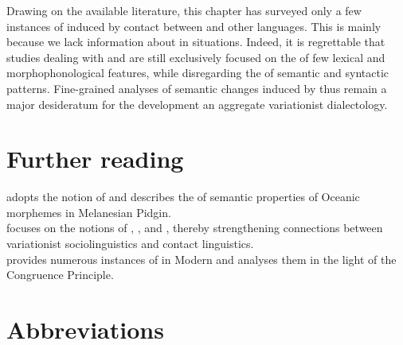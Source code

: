 \documentclass[output=paper]{langsci/langscibook}
\begin{document}
Drawing on the available literature, this chapter has surveyed only a few instances of   induced by contact between  and other languages. This is mainly because we lack information about  in  situations. Indeed, it is regrettable that studies dealing with  and   are still exclusively focused on the  of few lexical and morphophonological features, while disregarding the  of semantic and syntactic patterns. Fine-grained analyses of semantic changes induced by  thus remain a major desideratum for the development an aggregate variationist  dialectology.  

\section*{Further reading}

\citet{Keesing1988} adopts the notion of  and describes the  of semantic properties of Oceanic morphemes in Melanesian Pidgin.\\
\citet{Meyerhoff2009} focuses on the notions of , , and , thereby strengthening connections between variationist sociolinguistics and contact linguistics.\\
\citet{Zuckermann2009} provides numerous instances of  in Modern  and analyses them in the light of the Congruence Principle.

\section*{Abbreviations}
\end{document}
